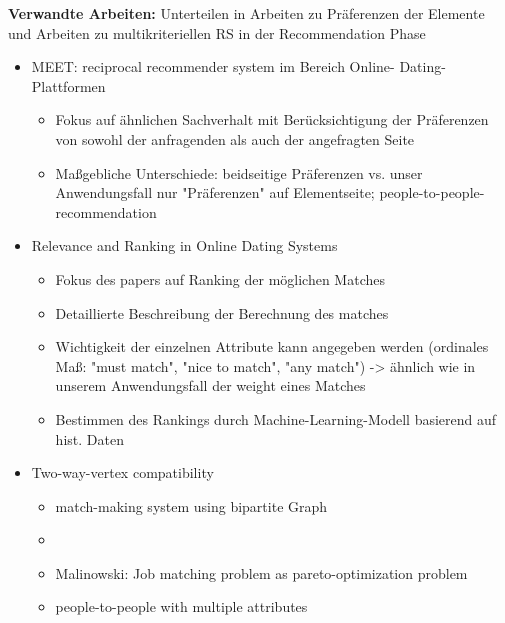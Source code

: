 \textbf{Verwandte Arbeiten:}
Unterteilen in Arbeiten zu Präferenzen der Elemente und Arbeiten zu multikriteriellen RS in der Recommendation Phase
\begin{itemize}
    \item MEET: reciprocal recommender system im Bereich Online- Dating- Plattformen %
    \begin{itemize}
        \item Fokus auf ähnlichen Sachverhalt mit Berücksichtigung der Präferenzen von sowohl der anfragenden als auch der angefragten Seite
        \item Maßgebliche Unterschiede: beidseitige Präferenzen vs. unser Anwendungsfall nur "Präferenzen" auf Elementseite; people-to-people-recommendation
    \end{itemize}
    \item Relevance and Ranking in Online Dating Systems %
    \begin{itemize}
        \item Fokus des papers auf Ranking der möglichen Matches
        \item Detaillierte Beschreibung der Berechnung des matches
        \item Wichtigkeit der einzelnen Attribute kann angegeben werden (ordinales Maß: "must match", "nice to match", "any match") -> ähnlich wie in unserem Anwendungsfall der weight eines Matches
        \item Bestimmen des Rankings durch Machine-Learning-Modell basierend auf hist. Daten
    \end{itemize}
    \item Two-way-vertex compatibility %
    \begin{itemize}
        \item match-making system using bipartite Graph
        \item 
    \end{itemize}
    \begin{itemize}
        \item Malinowski: Job matching problem as pareto-optimization problem %
    \end{itemize}
    \begin{itemize}
        \item people-to-people with multiple attributes %
    \end{itemize}
\end{itemize}

